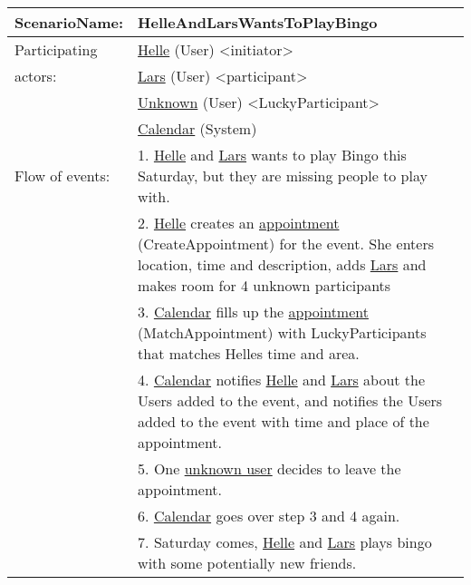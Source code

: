 {\tabulinesep=1.2mm
\begin{tabu}{ | p{3cm} | p{13cm} |}
    \hline
    ScenarioName: 			& 		HelleAndLarsWantsToPlayBingo\\ \hline
    Participating 			& 		\underline{Helle} (User) <initiator> \\
    actors:					&		\underline{Lars} (User) <participant>\\ 
    						&		\underline{Unknown} (User) <LuckyParticipant> \\
    						&		\underline{Calendar} (System) \\	\hline
    Flow of events: 		& 		1. \underline{Helle} and \underline{Lars} wants to play Bingo this Saturday, but they are missing people to play with. \\
							&		2. \underline{Helle} creates an \underline{appointment} (CreateAppointment) for the event. She enters location, time and description, adds \underline{Lars} and makes room for 4 unknown participants\\
							&		3. \underline{Calendar} fills up the \underline{appointment} (MatchAppointment) with LuckyParticipants that matches Helles time and area.\\
							&		4. \underline{Calendar} notifies \underline{Helle} and \underline{Lars} about the Users added to the event, and notifies the Users added to the event with time and place of the appointment.\\
							&		5. One \underline{unknown user} decides to leave the appointment. \\
							&		6. \underline{Calendar} goes over step 3 and 4 again.\\
							&		7. Saturday comes, \underline{Helle} and \underline{Lars} plays bingo with some potentially new friends.\\ \hline
\end{tabu}
}
